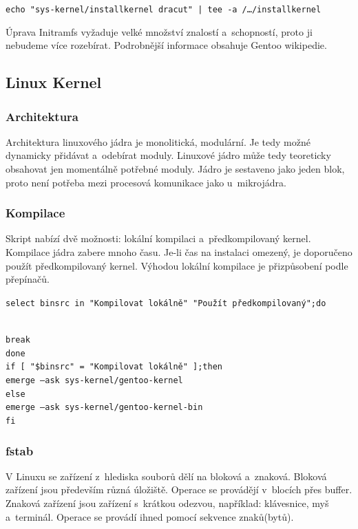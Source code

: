 \documentclass[12pt,a4paper,twoside,]{article}
\begin{document}
{{{{{{{\texttt{echo "sys-kernel/installkernel dracut" | tee -a /\dots/installkernel}

\hspace{-1.5em}Úprava {Initramfs} %
vyžaduje velké množství znalostí a~schopností, proto ji nebudeme více rozebírat. Podrobnější informace obsahuje Gentoo wikipedie. 


\subsection{\textsf{Linux Kernel}}
\subsubsection{\textsf{Architektura}}
Architektura linuxového jádra je monolitická, modulární. Je tedy možné dynamicky přidávat a~odebírat moduly. Linuxové jádro může tedy teoreticky obsahovat jen momentálně potřebné moduly. Jádro je sestaveno jako jeden blok, proto není potřeba mezi procesová komunikace jako u~mikrojádra. 
\subsubsection{\textsf{Kompilace}}
Skript nabízí dvě možnosti: lokální kompilaci a~předkompilovaný kernel. Kompilace jádra zabere mnoho času. Je-li čas na instalaci omezený, je doporučeno použít předkompilovaný kernel. Výhodou lokální kompilace je přizpůsobení podle přepínačů. 

\hspace{-1.5em}\texttt{select binsrc in "Kompilovat lokálně" "Použít předkompilovaný";do}}\\
\hspace*{1.5em}\texttt{break}\\
\texttt{done}\\
\texttt{if [ "\$binsrc" = "Kompilovat lokálně" ];then}\\
\texttt{\hspace*{1.5em}emerge --ask sys-kernel/gentoo-kernel}\\
\texttt{else}\\
\texttt{\hspace*{1.5em}emerge --ask sys-kernel/gentoo-kernel-bin}\\
\texttt{fi}\\
\newpage
\subsubsection{\textsf{fstab}}
V Linuxu se zařízení z~hlediska souborů dělí na bloková a~znaková. Bloková zařízení jsou především různá úložiště. Operace se provádějí v~blocích přes buffer. Znaková zařízení jsou zařízení s~krátkou odezvou, například: klávesnice, myš a~terminál. Operace se provádí ihned pomocí sekvence znaků(bytů).

}}}}}}
\end{document}
